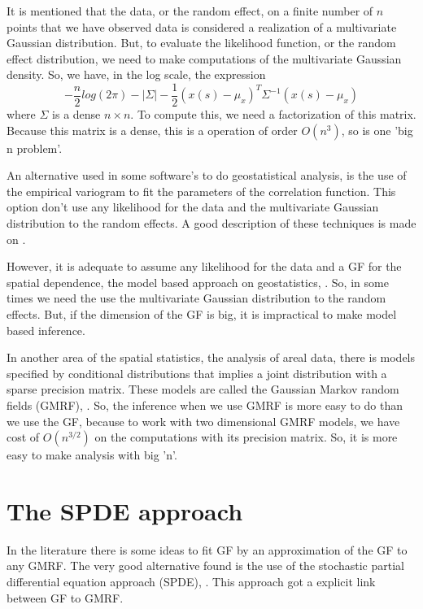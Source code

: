 It is mentioned that the data, or the random effect,  
on a finite number of $n$ points that we have observed 
data is considered a realization of a 
multivariate Gaussian distribution. 
But, to evaluate the likelihood function, or the random 
effect distribution, we need to make 
computations of the multivariate Gaussian density. 
So, we have, in the log scale, the expression 
\begin{equation}
-\frac{n}{2}log(2\pi)-|\Sigma| -\frac{1}{2}
(x(s) - \mu_x)^{T}\Sigma^{-1}(x(s)-\mu_x) 
\end{equation}
where $\Sigma$ is a dense $n\times n$. 
To compute this, we need a factorization of this matrix. 
Because this matrix is a dense, this is a operation of 
order $O(n^3)$, so is one 'big n problem'. 

An alternative used in some software's to do 
geostatistical analysis, is the use of the empirical 
variogram to fit the parameters of the correlation 
function. This option don't use any likelihood for 
the data and the multivariate Gaussian 
distribution to the random effects. 
A good description of these techniques is made 
on \cite{cressie:1993}. 

However, it is adequate to assume any likelihood for the 
data and a GF for the spatial dependence, the model 
based approach on geostatistics, \cite{diggleribeiro:2007}. 
So, in some times we need the use the multivariate 
Gaussian distribution to the random effects. 
But, if the dimension of the GF is big, 
it is impractical to make model based inference. 

In another area of the spatial statistics, the 
analysis of areal data, there is models specified 
by conditional distributions that implies a joint 
distribution with a sparse precision matrix. 
These models are called the 
Gaussian Markov random fields (GMRF), 
\cite{RueHeld:2005}. 
So, the inference when we use GMRF is more easy 
to do than we use the GF, because to work with two dimensional 
GMRF models, we have cost of $O(n^{3/2})$ 
on the computations with its precision matrix. 
So, it is more easy to make analysis with big 'n'. 
 
\section{The SPDE approach} 

In the literature there is some ideas to 
fit GF by an approximation of the GF to any GMRF. 
The very good alternative found is the use of 
the stochastic partial differential equation 
approach (SPDE), \cite{lindgrenRL:2011}. 
This approach got a explicit link between GF to GMRF. 


